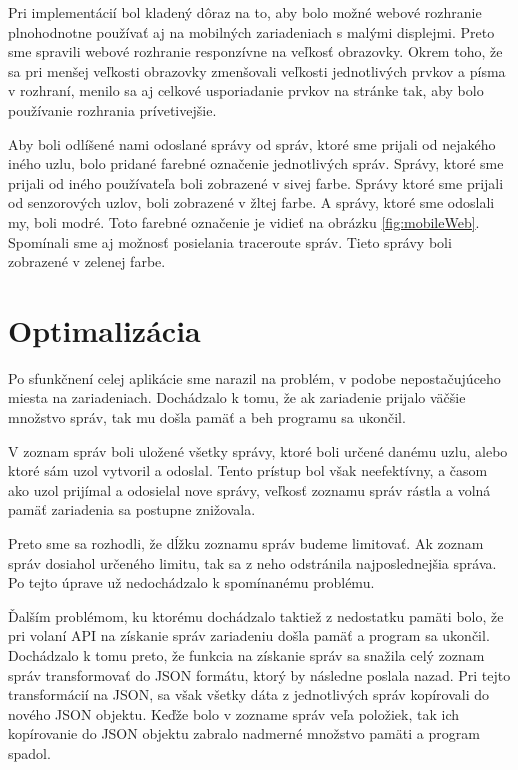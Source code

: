 \documentclass[slovak,master]{diploma}
\begin{document}
Pri implementácií bol kladený dôraz na to, aby bolo možné webové rozhranie plnohodnotne používať aj na mobilných zariadeniach s malými displejmi. Preto sme 
spravili webové rozhranie responzívne na veľkosť obrazovky. Okrem toho, že sa pri menšej veľkosti obrazovky zmenšovali veľkosti jednotlivých prvkov a písma v rozhraní, 
menilo sa aj celkové usporiadanie prvkov na stránke tak, aby bolo používanie rozhrania prívetivejšie. 

Aby boli odlíšené nami odoslané správy od správ, ktoré sme prijali od nejakého iného uzlu, bolo pridané farebné označenie jednotlivých správ. Správy, ktoré sme 
prijali od iného používateľa boli zobrazené v sivej farbe. Správy ktoré sme prijali od senzorových uzlov, boli zobrazené v žltej farbe. A správy, ktoré sme odoslali 
my, boli modré. Toto farebné označenie je vidieť na obrázku \ref{fig:mobileWeb}. Spomínali sme aj možnosť posielania traceroute správ. Tieto správy boli zobrazené v zelenej farbe.

\section{Optimalizácia}
Po sfunkčnení celej aplikácie sme narazil na problém, v podobe nepostačujúceho miesta na zariadeniach. Dochádzalo k tomu, že ak zariadenie prijalo 
väčšie množstvo správ, tak mu došla pamäť a beh programu sa ukončil.

V zoznam správ boli uložené všetky správy, ktoré boli určené danému uzlu, alebo ktoré sám uzol vytvoril a odoslal. Tento prístup bol však neefektívny, a časom ako 
uzol prijímal a odosielal nove správy, veľkosť zoznamu správ rástla a volná pamäť zariadenia sa postupne znižovala.

Preto sme sa rozhodli, že dĺžku zoznamu správ budeme limitovať. Ak zoznam správ dosiahol určeného limitu, tak sa z neho odstránila najposlednejšia správa.
Po tejto úprave už nedochádzalo k spomínanému problému.

Ďalším problémom, ku ktorému dochádzalo taktiež z nedostatku pamäti bolo, že pri volaní API na získanie správ zariadeniu došla pamäť a program sa ukončil.
Dochádzalo k tomu preto, že funkcia na získanie správ sa snažila celý zoznam správ transformovať do JSON formátu, ktorý by následne poslala nazad. Pri tejto transformácií 
na JSON, sa však všetky dáta z jednotlivých správ kopírovali do nového JSON objektu. Keďže bolo v zozname správ veľa položiek, tak ich kopírovanie do JSON objektu zabralo 
nadmerné množstvo pamäti a program spadol.
\end{document}
